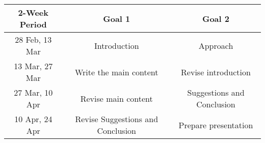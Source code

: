 \documentclass[11pt]{article}
\begin{document}
\begin{tabular}{c|c|c}
	2-Week Period & Goal 1 & Goal 2 \\
	\hline 
	28 Feb, 13 Mar & Introduction & Approach \\
	\hline
	13 Mar, 27 Mar & Write the main content & Revise introduction \\
	\hline
	27 Mar, 10 Apr & Revise main content &  Suggestions and Conclusion \\
	\hline
	10 Apr, 24 Apr & Revise Suggestions and Conclusion &  Prepare presentation \\
	\hline
\end{tabular}
\end{document}
